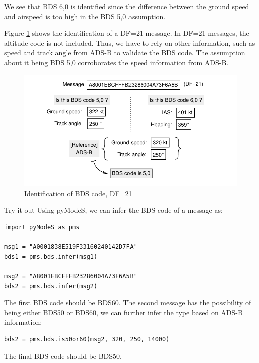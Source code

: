 We see that BDS 6,0 is identified since the difference between the ground speed and airspeed is too high in the BDS 5,0 assumption.

Figure \ref{fig:bds_bds_infer_example_2} shows the identification of a DF=21 message. In DF=21 messages, the altitude code is not included. Thus, we have to rely on other information, such as speed and track angle from ADS-B to validate the BDS code. The assumption about it being BDS 5,0 corroborates the speed information from ADS-B.

\begin{figure}[!ht]
\centering
\includegraphics[scale=0.8]{figures/mode_s/bds_infer_example_2.pdf}
\caption{Identification of BDS code, DF=21}
\label{fig:bds_bds_infer_example_2}
\end{figure}

\begin{notebox}{Try it out}
Using pyModeS, we can infer the BDS code of a message as: 

\begin{verbatim}
import pyModeS as pms

msg1 = "A0001838E519F33160240142D7FA"
bds1 = pms.bds.infer(msg1)

msg2 = "A8001EBCFFFB23286004A73F6A5B"
bds2 = pms.bds.infer(msg2) 
\end{verbatim}

The first BDS code should be BDS60. The second message has the possibility of being either BDS50 or BDS60, we can further infer the type based on ADS-B information:

\begin{verbatim}
bds2 = pms.bds.is50or60(msg2, 320, 250, 14000)
\end{verbatim}

The final BDS code should be BDS50. 

\end{notebox}
